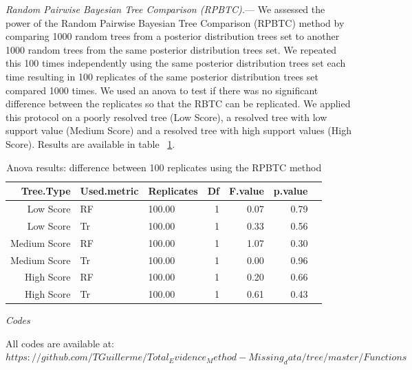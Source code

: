 \documentclass[12pt,letterpaper]{article}
\renewcommand{\subsection}[1]{%
\bigskip
\begin{center}
\begin{large}
\normalfont\itshape #1
\end{large}
\end{center}}
\renewcommand{\subsubsection}[1]{%
\vspace{2ex}
\noindent
\textit{#1.}---}
\begin{document}
\subsubsection{Random Pairwise Bayesian Tree Comparison (RPBTC)}
We assessed the power of the Random Pairwise Bayesian Tree Comparison (RPBTC) method by comparing 1000 random trees from a posterior distribution trees set to another 1000 random trees from the same posterior distribution trees set.
We repeated this 100 times independently using the same posterior distribution trees set each time resulting in 100 replicates of the same posterior distribution trees set compared 1000 times.
We used an anova to test if there was no significant difference between the replicates so that the RBTC can be replicated.
We applied this protocol on a poorly resolved tree (Low Score), a resolved tree with low support value (Medium Score) and a resolved tree with high support values (High Score).
Results are available in table ~\ref{RPBTC_testing}.

\begin{table}[ht]
\caption{Anova results: difference between 100 replicates using the RPBTC method}
\centering
\begin{tabular}{rllrrrr}
  \hline
  Tree.Type & Used.metric & Replicates & Df & F.value & p.value \\ [0.5ex]
  \hline
  Low Score & RF & 100.00 &   1 & 0.07 & 0.79 \\ [0.5ex]
  Low Score & Tr & 100.00 &   1 & 0.33 & 0.56 \\ [0.5ex]
  Medium Score & RF & 100.00 &   1 & 1.07 & 0.30 \\ [0.5ex]
  Medium Score & Tr & 100.00 &   1 & 0.00 & 0.96 \\ [0.5ex]
  High Score & RF & 100.00 &   1 & 0.20 & 0.66 \\ [0.5ex]
  High Score & Tr & 100.00 &   1 & 0.61 & 0.43 \\ [0.5ex]
  \hline
\end{tabular}
\label{RPBTC_testing}
\end{table}

\subsection{Codes}
All codes are available at: $https://github.com/TGuillerme/Total_Evidence_Method-Missing_data/tree/master/Functions$

\end{document}
